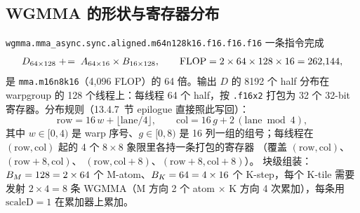 \subsection{WGMMA 的形状与寄存器分布}

\texttt{wgmma.\allowbreak{}mma\_\allowbreak{}async.\allowbreak{}sync.\allowbreak{}aligned.\allowbreak{}m64n128k16.f16.f16.f16} 一条指令完成
\begin{equation}
  D\sb{64 \times 128} \;+\!=\; A\sb{64 \times 16} \times B\sb{16 \times 128},
  \qquad
  \mathrm{FLOP} = 2 \times 64 \times 128 \times 16 = 262{,}144 ,
\end{equation}
是 \texttt{mma.\allowbreak{}m16n8k16}（4{,}096 FLOP）的 64 倍。输出 $D$ 的 8192 个 half 分布在
warpgroup 的 128 个线程上：每线程 64 个 half，按 \texttt{.f16x2} 打包为 32 个
32-bit 寄存器。分布规则（13.4.7~节 epilogue 直接照此写回）：
\begin{equation}
  \mathrm{row} = 16\,w + \lfloor \mathrm{lane} / 4 \rfloor,
  \qquad
  \mathrm{col} = 16\,g + 2\,(\mathrm{lane} \bmod 4),
  \label{eq:13-d-layout}
\end{equation}
其中 $w \in [0,4)$ 是 warp 序号、$g \in [0, 8)$ 是 16 列一组的组号；每线程在
$(\mathrm{row}, \mathrm{col})$ 起的 4 个 $8 \times 8$ 象限里各持一条打包的寄存器
（覆盖 $(\mathrm{row}, \mathrm{col})$、$(\mathrm{row}+8, \mathrm{col})$、
$(\mathrm{row}, \mathrm{col}+8)$、$(\mathrm{row}+8, \mathrm{col}+8)$）。
块级组装：$B\sb{M} = 128 = 2 \times 64$ 个 M-atom、$B\sb{K} = 64 = 4 \times 16$
个 K-step，每个 K-tile 需要发射 $2 \times 4 = 8$ 条 WGMMA（M 方向 2 个 atom
$\times$ K 方向 4 次累加），每条用 $\mathrm{scaleD} = 1$ 在累加器上累加。

